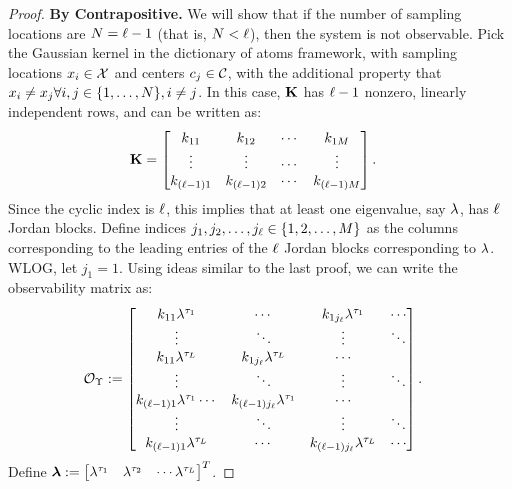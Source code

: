 \begin{proof}
	\textbf{By Contrapositive.} We will show that if the number of sampling locations are $ N=\ell-1 $ (that is, $ N < \ell$), then the system is not observable. Pick the Gaussian kernel in the dictionary of atoms framework,
	with sampling locations $x_i\in\mathcal{X}$ and centers $c_j\in\mathcal{C}$, with the additional 
	property that $x_i\neq x_j \forall i,j\in\{1,\dots,N\}, i\neq j$.
	In this case, 
	$\mathbf{K}$ has $\ell-1$ nonzero, linearly independent rows, and can be written as:
	\begin{align*}
	\mathbf{K} &= \begin{bmatrix}
	k_{11} & k_{12} & \cdots & k_{1M} \\
	\vdots & \vdots & \cdots & \vdots \\
	k_{(\ell-1)1} & k_{(\ell-1)2} & \cdots & k_{(\ell-1)M} 
	\end{bmatrix}.
	\end{align*}
	Since the cyclic index is $\ell$, this implies that at least one eigenvalue, say $\lambda$, has $\ell$ Jordan blocks. 
	Define indices $j_1, j_2, \dots, j_{\ell} \in \{1,2,\dots,M\}$ as the columns corresponding to the leading entries of the $\ell$ Jordan blocks corresponding to $\lambda$. WLOG, let $j_1 = 1$. Using ideas similar to the last proof, we can write the observability matrix as:
	\begin{align*}
	\mathcal{O}_{\Upsilon}
	&:= 
	\begin{bmatrix}
	k_{11}\lambda^{\tau_1}  & \cdots & k_{1j_{\ell}}\lambda^{\tau_1} & \cdots\\
	\vdots & \ddots &\vdots & \ddots\\
	k_{11}\lambda^{\tau_{L}}  & k_{1j_{\ell}}\lambda^{\tau_{L}} & \cdots\\
	\vdots & \ddots & \vdots & \ddots\\
	k_{(\ell-1)1}\lambda^{\tau_1}  \cdots & k_{(\ell-1)j_{\ell}}\lambda^{\tau_1} & \cdots\\
	\vdots & \ddots &\vdots & \ddots\\
	k_{(\ell-1)1}\lambda^{\tau_{L}}  & \cdots & k_{(\ell-1)j_{\ell}}\lambda^{\tau_{L}} & \cdots
	\end{bmatrix}.
	\end{align*}
	Define $\boldsymbol{\lambda}:= \begin{bmatrix}\lambda^{\tau_1} & \lambda^{\tau_2} & \cdots \lambda^{\tau_{L}}\end{bmatrix}^T$. 

\end{proof}
